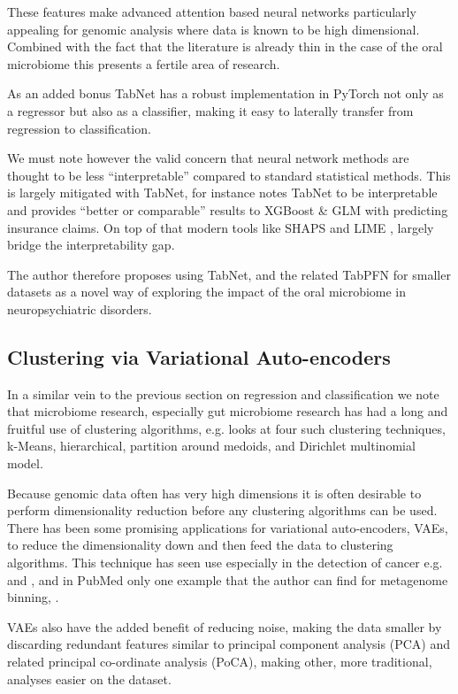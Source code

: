 \documentclass{article}
\begin{document}
\begin{multicols}{2}
These features make advanced attention based neural networks particularly appealing for genomic analysis where data is known to be high dimensional. Combined with the fact that the literature is already thin in the case of the oral microbiome this presents a fertile area of research. 

As an added bonus TabNet has a robust implementation in PyTorch \cite{noauthor_pytorch-tabnet_nodate} not only as a regressor but also as a classifier, making it easy to laterally transfer from regression to classification.

We must note however the valid concern that neural network methods are thought to be less ``interpretable'' compared to standard statistical methods. This is largely mitigated with TabNet, for instance \cite{MCDONNELL2023119543} notes TabNet to be interpretable and provides ``better or comparable'' results to XGBoost \& GLM with predicting insurance claims. On top of that modern tools like SHAPS \cite{lundberg_unified_2017} and LIME \cite{10.1145/2939672.2939778}, largely bridge the interpretability gap.

The author therefore proposes using TabNet, and the related TabPFN \cite{hollmann2022tabpfn} for smaller datasets as a novel way of exploring the impact of the oral microbiome in neuropsychiatric disorders.
\subsection{Clustering via Variational Auto-encoders}
In a similar vein to the previous section on regression and classification we note that microbiome research, especially gut microbiome research has had a long and fruitful use of clustering algorithms, e.g. \cite{shi_performance_2022} looks at four such clustering techniques, k-Means, hierarchical, partition around medoids, and Dirichlet multinomial model. 

Because genomic data often has very high dimensions it is often desirable to perform dimensionality reduction before any clustering algorithms can be used. There has been some promising applications for variational auto-encoders, VAEs, to reduce the dimensionality down and then feed the data to clustering algorithms. This technique has seen use especially in the detection of cancer e.g. \cite{hira_integrated_2021} and \cite{8983228}, and in PubMed only one example that the author can find for metagenome binning, \cite{nissen_improved_2021}.

 VAEs also have the added benefit of reducing noise, making the data smaller by discarding redundant features similar to principal component analysis (PCA) and related principal co-ordinate analysis (PoCA), making other, more traditional, analyses easier on the dataset. 
 

\end{multicols}
\end{document}
